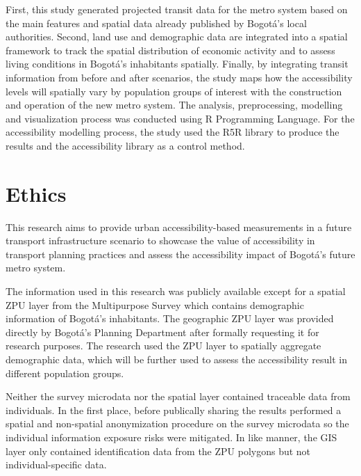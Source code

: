 \documentclass[12pt, a4paper]{report}
\begin{document}
First, this study generated projected transit data for the metro system based on the main features and spatial data already published by Bogotá's local authorities. Second, land use and demographic data are integrated into a spatial framework to track the spatial distribution of economic activity and to assess living conditions in Bogotá's inhabitants spatially. Finally, by integrating transit information from before and after scenarios, the study maps how the accessibility levels will spatially vary by population groups of interest with the construction and operation of the new metro system. The analysis, preprocessing, modelling and visualization process was conducted using R Programming Language. For the accessibility modelling process, the study used the R5R library to produce the results and the accessibility library as a control method.





\section{Ethics}

This research aims to provide urban accessibility-based measurements in a future transport infrastructure scenario to showcase the value of accessibility in transport planning practices and assess the accessibility impact of Bogotá's future metro system.

The information used in this research was publicly available except for a spatial ZPU layer \citep{secretariadistritaldeplaneacionMicrodatosEncuestaMultiproposito2023} from the Multipurpose Survey \citep{secretariadistritaldeplaneacionCapaGeograficaEncuesta2023} which contains demographic information of Bogotá's inhabitants. The geographic ZPU layer was provided directly by Bogotá's Planning Department after formally requesting it for research purposes. The research used the ZPU layer to spatially aggregate demographic data, which will be further used to assess the accessibility result in different population groups.

Neither the survey microdata nor the spatial layer contained traceable data from individuals. In the first place, before publically sharing the results \cite{secretariadistritaldeplaneacionMicrodatosEncuestaMultiproposito2023} performed a spatial and non-spatial anonymization procedure on the survey microdata so the individual information exposure risks were mitigated. In like manner, the GIS layer only contained identification data from the ZPU polygons but not individual-specific data.
\end{document}
